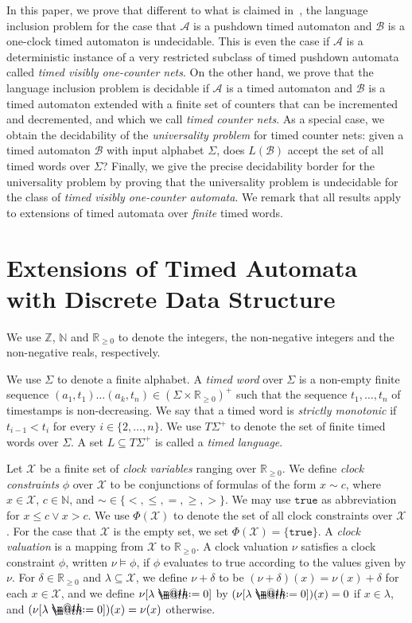 \documentclass{CSML}
\makeatletter
\theoremstyle{plain}\newtheorem{theorem}[thm]{Theorem}
\theoremstyle{plain}\newtheorem{corollary}[thm]{Corollary}
\theoremstyle{plain}\newtheorem{example}[thm]{Example}
\theoremstyle{plain}\newtheorem{lemma}[thm]{Lemma}
\theoremstyle{plain}\newtheorem{remark}[thm]{Remark}
\newcommand{\Z}{\mathbb{Z}}
\newcommand{\N}{\mathbb{N}}
\newcommand{\RP}{\mathbb{R}_{\geq 0}}
\newcommand{\B}{\mathcal{B}}
\newcommand{\clocks}{\mathcal{X}}
\newcommand{\clock}{x}
\newcommand{\TW}{T\Sigma^+}
\newcommand{\true}{\mathtt{true}}
\newcommand{\A}{\mathcal{A}}
\newcommand*{\defeq}{\mathrel{\rlap{\raisebox{0.3ex}{$\m@th\cdot$}}\raisebox{-0.3ex}{$\m@th\cdot$}}=}
\makeatother
\begin{document}
In this paper, 
we prove that different to what is claimed in~\cite{EmmiM06}, the language inclusion problem for the case that $\A$ is a  pushdown timed automaton and $\B$ is a one-clock timed automaton is undecidable. This is even the case if $\A$ is a deterministic instance of a very restricted subclass of timed pushdown automata called \emph{timed visibly one-counter nets}.
On the other hand,
we prove that the language inclusion problem is decidable if $\A$ is a timed automaton and $\B$ is a timed automaton extended with a finite set of counters that can be incremented and decremented, and which we call \emph{timed counter nets}. As a special case, we obtain the decidability of the \emph{universality problem} for timed counter nets: given a timed automaton $\B$ with input alphabet $\Sigma$, does $L(\B)$ accept the set of all timed words over $\Sigma$?
Finally, we give the precise decidability border for the universality problem by proving that the universality problem is undecidable for the class of \emph{timed visibly one-counter automata}. 
We remark that all results apply to extensions of timed automata over \emph{finite} timed words. 



\section{Extensions of Timed Automata with Discrete Data Structure}
We use $\Z$, $\N$ and  $\RP$ to denote the integers, the non-negative integers and  the non-negative reals, respectively.



We use $\Sigma$ to denote a finite alphabet. A {\em timed word} over $\Sigma$ is a non-empty finite sequence $(a_1,t_1)\dots(a_k,t_n)\in(\Sigma\times\RP)^+$ such that the sequence $t_1,\dots,t_n$ of timestamps is non-decreasing.
We say that a timed word is \emph{strictly monotonic} if $t_{i-1}<t_{i}$ for every $i\in\{2,\dots,n\}$. 
We use $\TW$ to denote the set of finite timed words over $\Sigma$.
A set $L\subseteq \TW$ is called a {\em timed language}.


 
Let $\clocks$ be a finite set of {\em clock variables} ranging over $\RP$.
We define {\em  clock constraints} $\phi$ over $\clocks$ to be conjunctions of formulas of the form $\clock\sim c$, where $\clock\in \clocks$, $c\in\N$, and $\sim\in\{<,\leq,=,\geq,>\}$. 
We may use $\true$ as abbreviation for $x\le c\vee x>c$. 
We use $\Phi(\clocks)$ to denote the set of all clock constraints over $\clocks$.
For the case that $\clocks$ is the empty set, we set $\Phi(\clocks)=\{\true\}$. 
A \emph{clock valuation} is a mapping from $\clocks$ to $\RP$. 
A clock valuation $\nu$ satisfies a clock constraint $\phi$, written $\nu\models\phi$, if $\phi$ evaluates to true according to the values given by $\nu$.
For $\delta\in\RP$ and $\lambda\subseteq \clocks$, we define $\nu+\delta$ to be $(\nu+\delta)(\clock)=\nu(\clock)+\delta$ for each $\clock\in \clocks$, and we define $\nu[\lambda\defeq 0]$ by $(\nu[\lambda\defeq 0])(x)=0$ if $x\in\lambda$, and $(\nu[\lambda\defeq 0])(x)=\nu(x)$ otherwise. 
\end{document}
